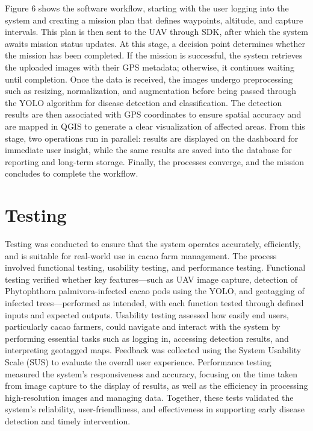 	Figure 6 shows the software workflow, starting with the user logging into the system and creating a mission plan that defines waypoints, altitude, and capture intervals. This plan is then sent to the UAV through SDK, after which the system awaits mission status updates. At this stage, a decision point determines whether the mission has been completed. If the mission is successful, the system retrieves the uploaded images with their GPS metadata; otherwise, it continues waiting until completion. Once the data is received, the images undergo preprocessing such as resizing, normalization, and augmentation before being passed through the YOLO algorithm for disease detection and classification. The detection results are then associated with GPS coordinates to ensure spatial accuracy and are mapped in QGIS to generate a clear visualization of affected areas. From this stage, two operations run in parallel: results are displayed on the dashboard for immediate user insight, while the same results are saved into the database for reporting and long-term storage. Finally, the processes converge, and the mission concludes to complete the workflow.
	
	\section{Testing} 
	Testing was conducted to ensure that the system operates accurately, efficiently, and is suitable for real-world use in cacao farm management. The process involved functional testing, usability testing, and performance testing. Functional testing verified whether key features—such as UAV image capture, detection of Phytophthora palmivora-infected cacao pods using the YOLO, and geotagging of infected trees—performed as intended, with each function tested through defined inputs and expected outputs. Usability testing assessed how easily end users, particularly cacao farmers, could navigate and interact with the system by performing essential tasks such as logging in, accessing detection results, and interpreting geotagged maps. Feedback was collected using the System Usability Scale (SUS) to evaluate the overall user experience. Performance testing measured the system’s responsiveness and accuracy, focusing on the time taken from image capture to the display of results, as well as the efficiency in processing high-resolution images and managing data. Together, these tests validated the system’s reliability, user-friendliness, and effectiveness in supporting early disease detection and timely intervention.
	
